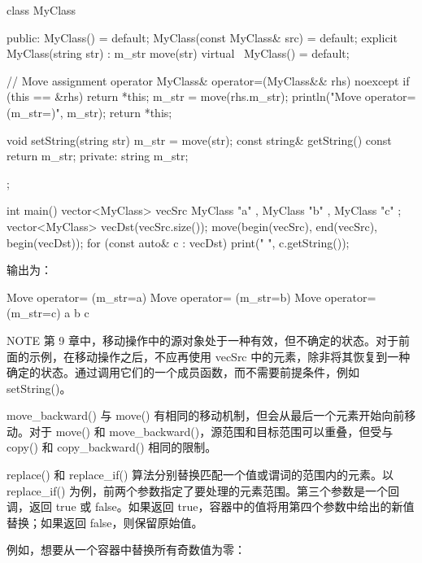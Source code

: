 \begin{cpp}
class MyClass
{
    public:
        MyClass() = default;
        MyClass(const MyClass& src) = default;
        explicit MyClass(string str) : m_str { move(str) } {}
        virtual ~MyClass() = default;

        // Move assignment operator
        MyClass& operator=(MyClass&& rhs) noexcept {
            if (this == &rhs) { return *this; }
            m_str = move(rhs.m_str);
            println("Move operator= (m_str={})", m_str);
            return *this;
        }

        void setString(string str) { m_str = move(str); }
        const string& getString() const { return m_str; }
    private:
        string m_str;
};

int main()
{
    vector<MyClass> vecSrc { MyClass { "a" }, MyClass { "b" }, MyClass { "c" } };
    vector<MyClass> vecDst(vecSrc.size());
    move(begin(vecSrc), end(vecSrc), begin(vecDst));
    for (const auto& c : vecDst) { print("{} ", c.getString()); }
}
\end{cpp}

输出为：

\begin{shell}
Move operator= (m_str=a)
Move operator= (m_str=b)
Move operator= (m_str=c)
a b c
\end{shell}

\begin{myNotic}{NOTE}
第 9 章中，移动操作中的源对象处于一种有效，但不确定的状态。对于前面的示例，在移动操作之后，不应再使用 vecSrc 中的元素，除非将其恢复到一种确定的状态。通过调用它们的一个成员函数，而不需要前提条件，例如 setString()。
\end{myNotic}

move\_backward() 与 move() 有相同的移动机制，但会从最后一个元素开始向前移动。对于 move() 和 move\_backward()，源范围和目标范围可以重叠，但受与 copy() 和 copy\_backward() 相同的限制。


replace() 和 replace\_if() 算法分别替换匹配一个值或谓词的范围内的元素。以 replace\_if() 为例，前两个参数指定了要处理的元素范围。第三个参数是一个回调，返回 true 或 false。如果返回 true，容器中的值将用第四个参数中给出的新值替换；如果返回 false，则保留原始值。

例如，想要从一个容器中替换所有奇数值为零：


